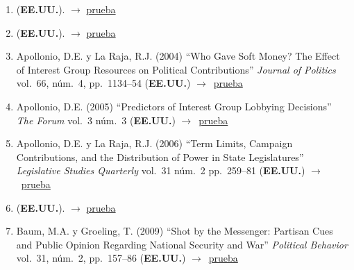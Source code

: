 \documentclass[12 pt, letter]{article}
\newenvironment{CitasMiTrabajo}{
    \begin{footnotesize}
    \begin{enumerate}[label={\footnotesize\emph{cita~\arabic*}},ref=\arabic*] %
        \setlength{\itemsep}{.1\itemsep}
        \setlength{\parskip}{.1\parskip}
    }{\end{enumerate}\end{footnotesize}}
\begin{document}
        \begin{CitasMiTrabajo}

        \item {} (\textbf{EE.UU.}). $\rightarrow$ \href{https://github.com/emagar/cv/blob/master/citasMiTrab/coxMagar/aleman.calvo.networkInitiation2013ps.pdf}{prueba}

       \item {} (\textbf{EE.UU.}).  $\rightarrow$ \href{https://www.researchgate.net/publication/269992446_What_do_representatives_produce_Work_profiles_of_representatives}{prueba}

        \item Apollonio, D.E. y La Raja, R.J. (2004)
        ``Who Gave Soft Money?
        The Effect of Interest Group Resources on Political Contributions''
        \emph{Journal of Politics} vol.\ 66, n\'um.\ 4, pp.\ 1134--54  (\textbf{EE.UU.}) $\rightarrow$~\href{https://github.com/emagar/cv/blob/master/citasMiTrab/coxMagar/apolRaja.pdf}{prueba}

       \item Apollonio, D.E. (2005) ``Predictors of Interest Group Lobbying Decisions'' \emph{The Forum} vol.\ 3 n\'um.\ 3 (\textbf{EE.UU.}) $\rightarrow$~\href{https://github.com/emagar/cv/blob/master/citasMiTrab/coxMagar/Apollonio2005.pdf}{prueba}

       \item Apollonio, D.E. y La Raja, R.J. (2006) ``Term Limits, Campaign Contributions, and the Distribution of Power in State Legislatures'' \emph{Legislative Studies Quarterly} vol.\ 31 n\'um.\ 2 pp.\ 259--81 (\textbf{EE.UU.}) $\rightarrow$~\href{https://github.com/emagar/cv/blob/master/citasMiTrab/coxMagar/apollonio+laraja2006lsq.pdf}{prueba}

       \item {} (\textbf{EE.UU.}).  $\rightarrow$ \href{https://pdfs.semanticscholar.org/8717/6b94f351e0eaf1a7b8e3a92e16f6dc57a7df.pdf}{prueba}
          
        \item Baum, M.A. y Groeling, T. (2009)
        ``Shot by the Messenger: Partisan Cues and Public Opinion
        Regarding National Security and War''
        \emph{Political Behavior}  vol.\ 31, n\'um.\ 2, pp.\ 157--86 (\textbf{EE.UU.}) $\rightarrow$~\href{https://github.com/emagar/cv/blob/master/citasMiTrab/coxMagar/baum.pdf}{prueba}


\end{CitasMiTrabajo}
\end{document}
